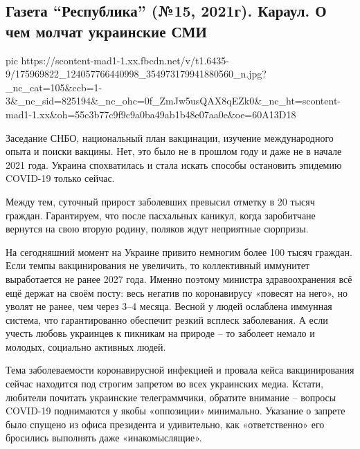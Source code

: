  
 
 
 
 

\subsection{Газета \enquote{Республика} (№15, 2021г).  Караул.  О чем молчат украинские СМИ}


\ifcmt
  pic https://scontent-mad1-1.xx.fbcdn.net/v/t1.6435-9/175969822_124057766440998_354973179941880560_n.jpg?_nc_cat=105&ccb=1-3&_nc_sid=825194&_nc_ohc=0f_ZmJw5usQAX8qEZk0&_nc_ht=scontent-mad1-1.xx&oh=55c3b77c9f9c9a0ba49ab1b48e07aa0e&oe=60A13D18
\fi


Заседание СНБО, национальный план вакцинации, изучение международного опыта и
поиски вакцины. Нет, это было не в прошлом году и даже не в начале 2021 года.
Украина спохватилась и стала искать способы остановить эпидемию COVID-19 только
сейчас. 

Между тем, суточный прирост заболевших превысил отметку в 20 тысяч граждан.
Гарантируем, что после пасхальных каникул, когда заробитчане вернутся на свою
вторую родину, поляков ждут неприятные сюрпризы.

На сегодняшний момент на Украине привито немногим более 100 тысяч граждан. Если
темпы вакцинирования не увеличить, то коллективный иммунитет выработается не
ранее 2027 года. Именно поэтому министра здравоохранения всё ещё держат на
своём посту: весь негатив по коронавирусу «повесят на него», но уволят не
ранее, чем через 3–4 месяца. Весной у людей ослаблена иммунная система, что
гарантированно обеспечит резкий всплеск заболевания. А если учесть любовь
украинцев к пикникам на природе – то заболеет немало и молодых, социально
активных людей. 

Тема заболеваемости коронавирусной инфекцией и провала кейса вакцинирования
сейчас находится под строгим запретом во всех украинских медиа. Кстати,
любители почитать украинские телеграммчики, обратите внимание – вопросы
COVID-19 поднимаются у якобы «оппозиции» минимально. Указание о запрете было
спущено из офиса президента и удивительно, как «ответственно» его бросились
выполнять даже «инакомыслящие». 

